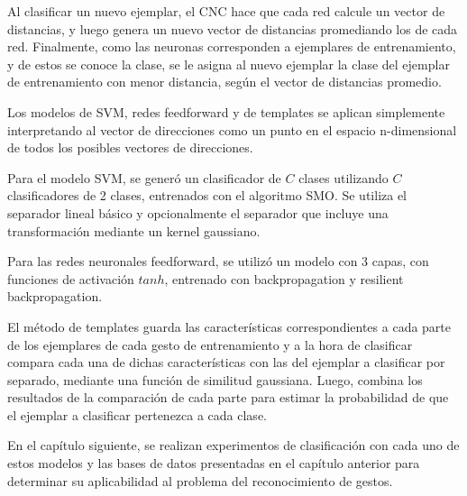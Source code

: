 Al clasificar un nuevo ejemplar, el CNC hace que cada red calcule un vector de distancias, y luego genera un nuevo vector de distancias promediando los de cada red. Finalmente, como las neuronas corresponden a ejemplares de entrenamiento, y de estos se conoce la clase, se le asigna al nuevo ejemplar la clase del ejemplar de entrenamiento con menor distancia, según el vector de distancias promedio.

Los modelos de SVM, redes feedforward y de templates se aplican simplemente interpretando al vector de direcciones como un punto en el espacio n-dimensional de todos los posibles vectores de direcciones. 

Para el modelo SVM, se generó un clasificador de $C$ clases utilizando $C$ clasificadores de 2 clases, entrenados con el algoritmo SMO. Se utiliza el separador lineal básico y opcionalmente el separador que incluye una transformación mediante un kernel gaussiano.

Para las redes neuronales feedforward, se utilizó un modelo con 3 capas, con funciones de activación $tanh$, entrenado con backpropagation y resilient backpropagation.

El método de templates guarda las características correspondientes a cada parte de los ejemplares de cada gesto de entrenamiento y a la hora de clasificar compara cada una de dichas características con las del ejemplar a clasificar por separado, mediante una función de similitud gaussiana. Luego, combina los resultados de la comparación de cada parte para estimar la probabilidad de que el ejemplar a clasificar pertenezca a cada clase.

En el capítulo siguiente, se realizan experimentos de clasificación con cada uno de estos modelos y las bases de datos presentadas en el capítulo anterior para determinar su aplicabilidad al problema del reconocimiento de gestos.
